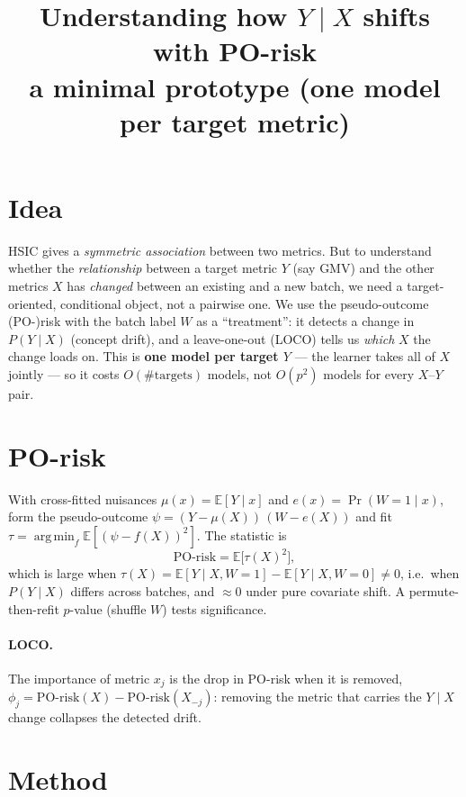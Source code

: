 \documentclass[11pt]{article}
\title{\textbf{Understanding how $Y\mid X$ shifts with PO-risk\\
\large a minimal prototype (one model per target metric)}}
\author{}
\date{}
\newcommand{\E}{\mathbb{E}}
\newcommand{\argmin}{\operatorname*{arg\,min}}
\begin{document}
\maketitle

\section{Idea}

HSIC gives a \emph{symmetric association} between two metrics. But to understand
whether the \emph{relationship} between a target metric $Y$ (say GMV) and the
other metrics $X$ has \emph{changed} between an existing and a new batch, we need
a target-oriented, conditional object, not a pairwise one. We use the
pseudo-outcome (PO-)risk with the batch label $W$ as a ``treatment'': it detects
a change in $P(Y\mid X)$ (concept drift), and a leave-one-out (LOCO) tells us
\emph{which} $X$ the change loads on. This is \textbf{one model per target $Y$}
--- the learner takes all of $X$ jointly --- so it costs $O(\#\text{targets})$
models, not $O(p^2)$ models for every $X$--$Y$ pair.

\section{PO-risk}

With cross-fitted nuisances $\mu(x)=\E[Y\mid x]$ and $e(x)=\Pr(W{=}1\mid x)$,
form the pseudo-outcome $\psi=(Y-\mu(X))\,(W-e(X))$ and fit
$\tau=\argmin_f \E[(\psi-f(X))^2]$. The statistic is
\begin{equation}
\mathrm{PO\text{-}risk}=\E\big[\tau(X)^2\big],
\end{equation}
which is large when $\tau(X)=\E[Y\mid X,W{=}1]-\E[Y\mid X,W{=}0]\neq0$, i.e.\ when
$P(Y\mid X)$ differs across batches, and $\approx 0$ under pure covariate shift.
A permute-then-refit $p$-value (shuffle $W$) tests significance.

\paragraph{LOCO.} The importance of metric $x_j$ is the drop in PO-risk when it
is removed, $\phi_j=\mathrm{PO\text{-}risk}(X)-\mathrm{PO\text{-}risk}(X_{-j})$:
removing the metric that carries the $Y\mid X$ change collapses the detected
drift.

\section{Method}
\end{document}
